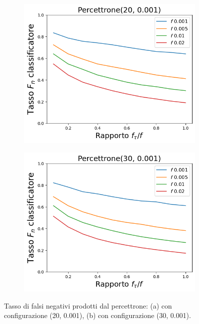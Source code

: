 \documentclass[../../main.tex]{subfiles}
\begin{document}
    \begin{figure}[H]
        \centering
        \begin{subfigure}[b]{0.49\textwidth}
            \centering
            \includegraphics[width = \textwidth]{immagini/7/LBF/Percettrone(20, 0.001)_FNR.png}
            \caption{}
            \label{fig:LBFFNRPercettrone20}
        \end{subfigure}
        \begin{subfigure}[b]{0.49\textwidth}
            \centering
            \includegraphics[width = \textwidth]{immagini/7/LBF/Percettrone(30, 0.001)_FNR.png}
            \caption{}
            \label{fig:LBFFNRPercettrone30}
        \end{subfigure}
        \caption{Tasso di falsi negativi prodotti dal percettrone: (a) con configurazione (20, 0.001), (b) con configurazione (30, 0.001).}
        \label{fig:LBFFNRPercettrone}
    \end{figure}
\end{document}

